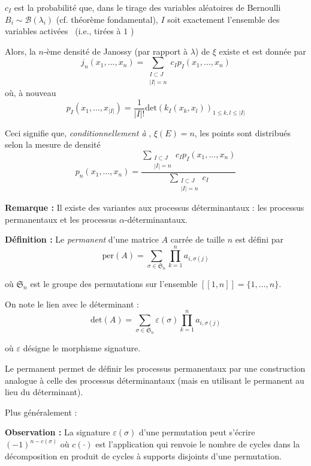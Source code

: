 \documentclass[12pt]{article}
\let\oldsum\sum
\renewcommand{\sum}{\oldsum\limits}
\begin{document}
$ c_I $ est la probabilité que, dans le tirage des variables aléatoires de Bernoulli $ B_i \sim \mathcal B(\lambda_i) $ (cf. théorème fondamental), $ I $ soit exactement l'ensemble des variables \og activées \fg \, (i.e., tirées à \og $1$ \fg)

Alors, la $n$-ème densité de Janossy (par rapport à $\lambda$) de $\xi$ existe et est donnée par $$ j_n(x_1,...,x_n) = \sum_{ \substack{I \subset J \\ |I| = n } } c_I p_I(x_1,...,x_n) $$ où, à nouveau $$ p_I(x_1,...,x_{|I|}) = \frac{1}{|I|!} \mathrm{det}(k_I(x_k,x_l))_{1\leqslant k,l \leqslant |I|}$$ 

Ceci signifie que, \textit{conditionnellement à }, $ \xi(E) = n $, les points sont distribués selon la mesure de densité $$ p_n(x_1,...,x_n) = \frac{ \sum_{ \substack{I \subset J \\ |I| = n } } c_I p_I(x_1,...,x_n) }{ \sum_{ \substack{I \subset J \\ |I| = n } } c_I } $$ 












\textbf{Remarque :} Il existe des variantes aux processus déterminantaux : les processus permanentaux et les processus $\alpha$-déterminantaux.

\textbf{Définition :} Le \textit{permanent} d'une matrice $A$ carrée de taille $n$ est défini par $$ \mathrm{per}(A) = \sum_{\sigma \in \mathfrak S_n} \prod_{k=1}^n a_{i,\sigma(j)} $$ 

où $\mathfrak S_n$ est le groupe des permutations sur l'ensemble $[\![ 1,n ]\!] = \{1,...,n\} $.

On note le lien avec le déterminant : $$ \mathrm{det}(A) = \sum_{\sigma \in \mathfrak S_n} \varepsilon (\sigma) \prod_{k=1}^n a_{i,\sigma(j)} $$ 

où $\varepsilon$ désigne le morphisme signature. 

Le permanent permet de définir les processus permanentaux par une construction analogue à celle des processus déterminantaux (mais en utilisant le permanent au lieu du déterminant). 

Plus généralement : 

\textbf{Observation :} La signature $\varepsilon (\sigma)$ d'une permutation peut s'écrire $(-1)^{n - c(\sigma)}$ où $c(\cdot)$ est l'application qui renvoie le nombre de cycles dans la décomposition en produit de cycles à supports disjoints d'une permutation.
\end{document}

